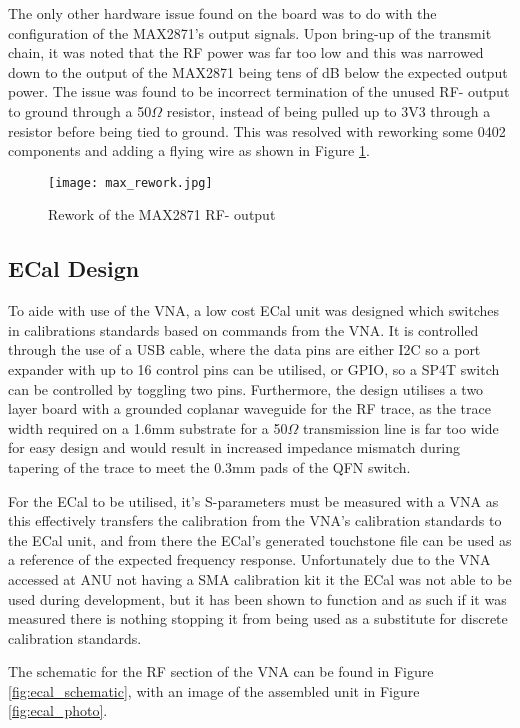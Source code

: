 The only other hardware issue found on the board was to do with the configuration of the MAX2871's output signals. Upon bring-up of the transmit chain, it was noted that the RF power was far too low and this was narrowed down to the output of the MAX2871 being tens of dB below the expected output power. The issue was found to be incorrect termination of the unused RF- output to ground through a 50$\Omega$ resistor, instead of being pulled up to 3V3 through a resistor before being tied to ground. This was resolved with reworking some 0402 components and adding a flying wire as shown in Figure \ref{fig:max_rework}.

\begin{figure}[H]
	\centering
	\texttt{[image: max\_rework.jpg]}
	\caption{Rework of the MAX2871 RF- output}
	\label{fig:max_rework}
\end{figure}

\subsection{ECal Design}
To aide with use of the VNA, a low cost ECal unit was designed which switches in calibrations standards based on commands from the VNA. It is controlled through the use of a USB cable, where the data pins are either I2C so a port expander with up to 16 control pins can be utilised, or GPIO, so a SP4T switch can be controlled by toggling two pins. Furthermore, the design utilises a two layer board with a grounded coplanar waveguide for the RF trace, as the trace width required on a 1.6mm substrate for a 50$\Omega$ transmission line is far too wide for easy design and would result in increased impedance mismatch during tapering of the trace to meet the 0.3mm pads of the QFN switch. 

For the ECal to be utilised, it's S-parameters must be measured with a VNA as this effectively transfers the calibration from the VNA's calibration standards to the ECal unit, and from there the ECal's generated touchstone file can be used as a reference of the expected frequency response. Unfortunately due to the VNA accessed at ANU not having a SMA calibration kit it the ECal was not able to be used during development, but it has been shown to function and as such if it was measured there is nothing stopping it from being used as a substitute for discrete calibration standards.

The schematic for the RF section of the VNA can be found in Figure \ref{fig:ecal_schematic}, with an image of the assembled unit in Figure \ref{fig:ecal_photo}.

